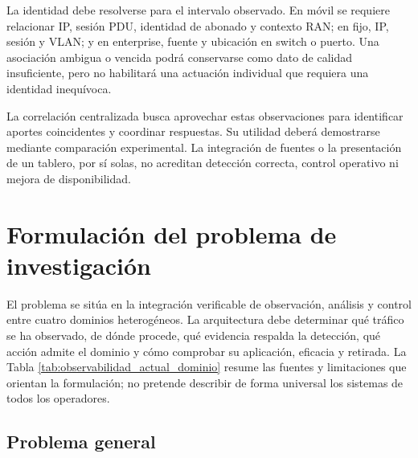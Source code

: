 La identidad debe resolverse para el intervalo observado. En móvil se requiere relacionar IP, sesión PDU, identidad de abonado y contexto RAN; en fijo, IP, sesión y VLAN; y en enterprise, fuente y ubicación en switch o puerto. Una asociación ambigua o vencida podrá conservarse como dato de calidad insuficiente, pero no habilitará una actuación individual que requiera una identidad inequívoca.

La correlación centralizada busca aprovechar estas observaciones para identificar aportes coincidentes y coordinar respuestas. Su utilidad deberá demostrarse mediante comparación experimental. La integración de fuentes o la presentación de un tablero, por sí solas, no acreditan detección correcta, control operativo ni mejora de disponibilidad.

\section{Formulación del problema de investigación}

El problema se sitúa en la integración verificable de observación, análisis y control entre cuatro dominios heterogéneos. La arquitectura debe determinar qué tráfico se ha observado, de dónde procede, qué evidencia respalda la detección, qué acción admite el dominio y cómo comprobar su aplicación, eficacia y retirada. La Tabla \ref{tab:observabilidad_actual_dominio} resume las fuentes y limitaciones que orientan la formulación; no pretende describir de forma universal los sistemas de todos los operadores.

\subsection{Problema general}

